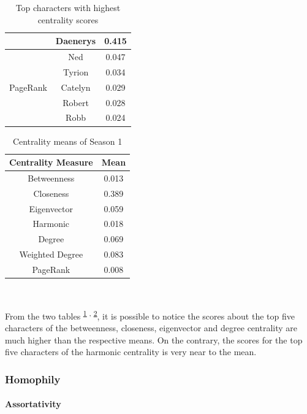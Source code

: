\documentclass[10pt,twocolumn,letterpaper]{article}
\begin{document}
\begin{table}[!h]
\begin{tabular}{c|c|c}
                    & Daenerys & 0.415 \\
        \hline
                    & Ned & 0.047 \\
                    & Tyrion & 0.034 \\
        PageRank    & Catelyn & 0.029 \\
                    & Robert & 0.028 \\
                    & Robb & 0.024 \\
        \hline
    \end{tabular}
    \vspace{0.2cm}
    \caption{Top characters with highest centrality scores}
    \label{tab:cent_s1}
\end{table}






\begin{table}[!h]
    \centering
    \small
    \begin{tabular}{c|c}
        Centrality Measure & Mean  \\
        \hline
        Betweenness & 0.013 \\
        Closeness & 0.389 \\
        Eigenvector & 0.059 \\
        Harmonic & 0.018 \\
        Degree & 0.069 \\
        Weighted Degree & 0.083 \\
        PageRank & 0.008 \\
        \hline 
    \end{tabular} \\
    \caption{Centrality means of Season 1}
    \label{tab:mcent_s1}
\end{table}

From the two tables \textsuperscript{\ref{tab:cent_s1} , \ref{tab:mcent_s1}}, it is possible to notice the scores about the top five characters of the betweenness, closeness, eigenvector and degree centrality are much higher than the respective means. On
the contrary, the scores for the top five characters of the harmonic centrality is very near to the mean.

\subsubsection{Homophily}



\paragraph{Assortativity}
\end{document}

